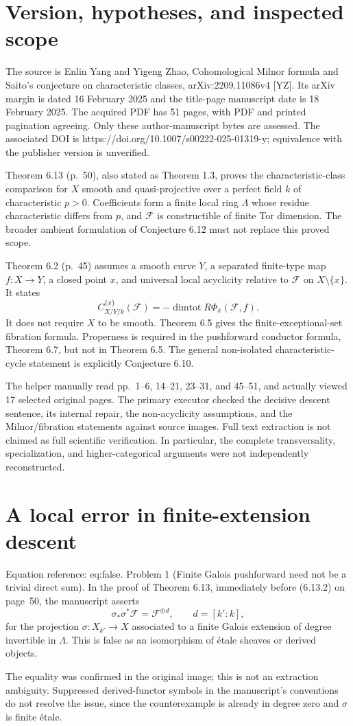 \documentclass[10pt]{article}
\begin{document}
\section*{Version, hypotheses, and inspected scope}
The source is Enlin Yang and Yigeng Zhao, Cohomological Milnor formula and Saito’s conjecture on characteristic classes, arXiv:2209.11086v4 [YZ]. Its arXiv margin is dated 16 February 2025 and the title-page manuscript date is 18 February 2025. The acquired PDF has 51 pages, with PDF and printed pagination agreeing. Only these author-manuscript bytes are assessed. The associated DOI is https://doi.org/10.1007/s00222-025-01319-y; equivalence with the publisher version is unverified.\par
Theorem 6.13 (p. 50), also stated as Theorem 1.3, proves the characteristic-class comparison for \(X\) smooth and quasi-projective over a perfect field \(k\) of characteristic \(p>0\). Coefficients form a finite local ring \(\Lambda\) whose residue characteristic differs from \(p\), and \(\mathcal F\) is constructible of finite Tor dimension. The broader ambient formulation of Conjecture 6.12 must not replace this proved scope.\par
Theorem 6.2 (p. 45) assumes a smooth curve \(Y\), a separated finite-type map \(f:X\to Y\), a closed point \(x\), and universal local acyclicity relative to \(\mathcal F\) on \(X\setminus\{x\}\). It states \[C^{\{x\}}_{X/Y/k}(\mathcal F)=-\operatorname{dimtot}R\Phi_{\bar x}(\mathcal F,f).\] It does not require \(X\) to be smooth. Theorem 6.5 gives the finite-exceptional-set fibration formula. Properness is required in the pushforward conductor formula, Theorem 6.7, but not in Theorem 6.5. The general non-isolated characteristic-cycle statement is explicitly Conjecture 6.10.\par
The helper manually read pp. 1–6, 14–21, 23–31, and 45–51, and actually viewed 17 selected original pages. The primary executor checked the decisive descent sentence, its internal repair, the non-acyclicity assumptions, and the Milnor/fibration statements against source images. Full text extraction is not claimed as full scientific verification. In particular, the complete transversality, specialization, and higher-categorical arguments were not independently reconstructed.\par
\section*{A local error in finite-extension descent}
Equation reference: eq:false. Problem 1 (Finite Galois pushforward need not be a trivial direct sum).  In the proof of Theorem 6.13, immediately before (6.13.2) on page 50, the manuscript asserts \[
 \sigma_*\sigma^*\mathcal F=\mathcal F^{\oplus d},
 \qquad d=[k':k],\] for the projection \(\sigma:X_{k'}\to X\) associated to a finite Galois extension of degree invertible in \(\Lambda\). This is false as an isomorphism of étale sheaves or derived objects.\par
The equality was confirmed in the original image; this is not an extraction ambiguity. Suppressed derived-functor symbols in the manuscript’s conventions do not resolve the issue, since the counterexample is already in degree zero and \(\sigma\) is finite étale.\par
\end{document}
